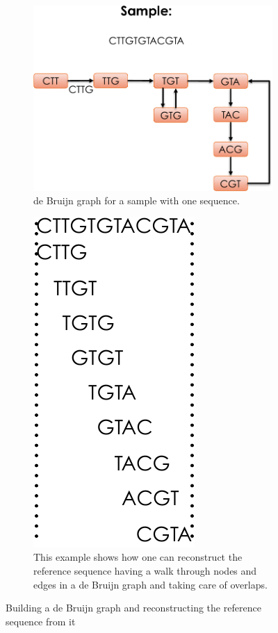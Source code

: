 \begin{figure}
\centering
\begin{subfigure}{.5\textwidth}
  \centering
  \includegraphics[width=\linewidth]{figs/dbg1-cropped.pdf}
  \caption{de Bruijn graph for a sample with one sequence.}
  \label{fig:dbg-a}
\end{subfigure}%
\begin{subfigure}{.5\textwidth}
  \centering
  \includegraphics[width=.4\linewidth]{figs/dbg2-cropped.pdf}
  \caption{This example shows how one can reconstruct the reference sequence 
  having a walk through nodes and edges in a de Bruijn graph and taking care of overlaps.}
  \label{fig:dbg-b}
\end{subfigure}
\caption{Building a de Bruijn graph and reconstructing the reference sequence from it}
\label{fig:dbg}
\end{figure}

